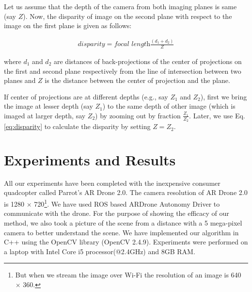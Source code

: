 Let us assume that the depth of the camera from both imaging planes is same
(say $Z$). Now, the disparity of image on the second plane with respect to the
image on the first plane is given as follows\cite{Prasad16}:
\begin{ceqn}
\begin{align}
\textit{disparity} = \textit{focal length}\frac{(d_1+d_2)}{Z}
\label{eq:disparity}
\end{align}
\end{ceqn}

where $d_1$ and $d_2$ are distances of back-projections of the center of
projections on the first and second plane respectively from the line of
intersection between two planes and $Z$ is the distance between the center of
projection and the plane.

If center of projections are at different depths (e.g., say $Z_1$ and
$Z_2$), first we bring the image at lesser depth (say $Z_1$) to the same depth
of other image (which is imaged at larger depth, say $Z_2$) by zooming out by
fraction $\frac{Z_1}{Z_2}$. Later, we use Eq. \ref{eq:disparity} to calculate
the disparity by setting $Z=Z_2$.

\section{Experiments and Results}
All our experiments have been completed with the inexpensive consumer
quadcopter called  Parrot’s AR Drone 2.0. The camera resolution of AR Drone 2.0
is 1280 $\times$ 720\footnote{But when we stream the image over Wi-Fi the resolution
of an image is 640 $\times$ 360.}. We have used ROS based ARDrone Autonomy
Driver to communicate with the drone. For the purpose of showing the efficacy
of our method, we also took a picture of the scene from a distance with a 5
mega-pixel camera to better understand the scene. We have implemented our
algorithm in C++ using the OpenCV library (OpenCV 2.4.9).  Experiments were
performed on a laptop with Intel Core i5 processor(@2.4GHz) and 8GB RAM.

